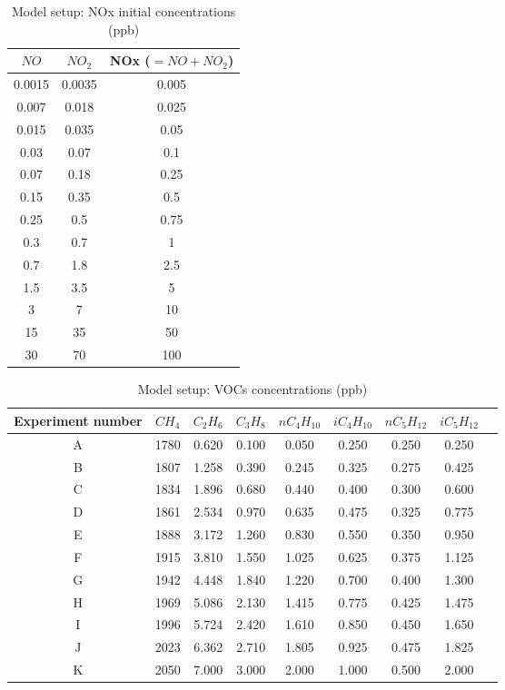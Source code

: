 \documentclass[11pt,a4paper]{article}
\begin{document}
\begin{table} %
\caption{Model setup: NOx initial concentrations (ppb)}
\label{tab:setupNOx}
\centering
\begin{tabular}{ccc}
\hline
$NO$      & $NO_2$      & NOx  ($=NO+NO_2$) \\
\hline
0.0015    & 0.0035      & 0.005 \\
0.007     & 0.018       & 0.025 \\
0.015     & 0.035       & 0.05  \\
0.03      & 0.07        & 0.1   \\
0.07      & 0.18        & 0.25  \\
0.15      & 0.35        & 0.5   \\
0.25      & 0.5         & 0.75  \\
0.3       & 0.7         & 1     \\
0.7       & 1.8         & 2.5   \\
1.5       & 3.5         & 5     \\
3         & 7           & 10    \\
15        & 35          & 50    \\
30        & 70          & 100   \\
\hline
\end{tabular}
\end{table}	

\begin{table} %
\caption{Model setup: VOCs concentrations (ppb)}
\label{tab:setupVOCs}
\centering
\begin{tabular}{ccccccccc}
\hline
Experiment number & $CH_4$ & $C_2H_6$ & $C_3H_8$ & $nC_4H_{10}$ & $iC_4H_{10}$ & $nC_5H_{12}$ & $iC_5H_{12}$ \\
\hline
A  & 1780 &	0.620 &	0.100 &	0.050 &	0.250 &	0.250 &	0.250 \\
B  & 1807 &	1.258 &	0.390 &	0.245 &	0.325 &	0.275 &	0.425 \\
C  & 1834 &	1.896 &	0.680 &	0.440 &	0.400 &	0.300 &	0.600 \\
D  & 1861 &	2.534 &	0.970 &	0.635 &	0.475 &	0.325 &	0.775 \\
E  & 1888 &	3.172 &	1.260 &	0.830 &	0.550 &	0.350 &	0.950 \\
F  & 1915 &	3.810 &	1.550 &	1.025 &	0.625 &	0.375 &	1.125 \\
G  & 1942 &	4.448 &	1.840 &	1.220 &	0.700 &	0.400 &	1.300 \\
H  & 1969 &	5.086 &	2.130 &	1.415 &	0.775 &	0.425 &	1.475 \\
I  & 1996 &	5.724 &	2.420 &	1.610 &	0.850 &	0.450 &	1.650 \\
J  & 2023 &	6.362 &	2.710 &	1.805 &	0.925 &	0.475 &	1.825 \\
K  & 2050 &	7.000 &	3.000 &	2.000 &	1.000 &	0.500 &	2.000 \\
\hline
\end{tabular}
\end{table}
\end{document}
